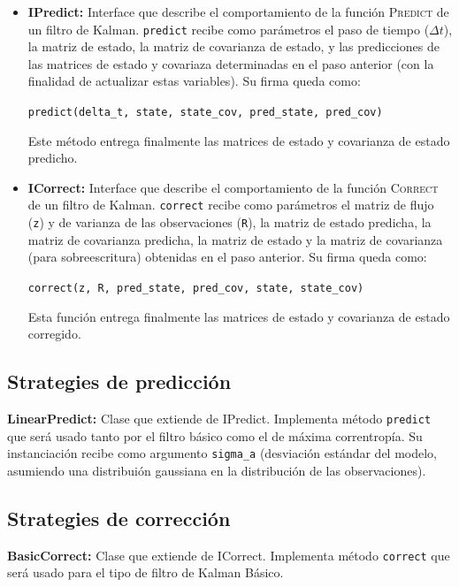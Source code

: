 \begin{itemize}
\item \textbf{IPredict:} Interface que describe el comportamiento de la funci\'on \textsc{Predict} de un filtro de Kalman. \texttt{predict} recibe como par\'ametros el paso de tiempo ($\Delta t$), la matriz de estado, la matriz de covarianza de estado, y las predicciones de las matrices de estado y covariaza determinadas en el paso anterior (con la finalidad de actualizar estas variables). Su firma queda como:
\begin{center}
\texttt{predict(delta\_t, state, state\_cov, pred\_state, pred\_cov)}
\end{center}
Este m\'etodo entrega finalmente las matrices de estado y covarianza de estado predicho.
\bigskip

\item \textbf{ICorrect:} Interface que describe el comportamiento de la funci\'on \textsc{Correct} de un filtro de Kalman. \texttt{correct} recibe como par\'ametros el matriz de flujo (\texttt{z}) y de varianza de las observaciones (\texttt{R}), la matriz de estado predicha, la matriz de covarianza predicha, la matriz de estado y la matriz de covarianza (para sobreescritura) obtenidas en el paso anterior. Su firma queda como:
\begin{center}
\texttt{correct(z, R, pred\_state, pred\_cov, state, state\_cov)}
\end{center}
\bigskip
Esta funci\'on entrega finalmente las matrices de estado y covarianza de estado corregido.

\end{itemize}

\subsection{Strategies de predicci\'on}
\textbf{LinearPredict:} Clase que extiende de IPredict. Implementa m\'etodo \texttt{predict} que ser\'a usado tanto por el filtro b\'asico como el de m\'axima correntrop\'ia. Su instanciaci\'on recibe como argumento \texttt{sigma\_a} (desviaci\'on est\'andar del modelo, asumiendo una distribui\'on gaussiana en la distribuci\'on de las observaciones).
\bigskip


\subsection{Strategies de correcci\'on}
\textbf{BasicCorrect:} Clase que extiende de ICorrect. Implementa m\'etodo \texttt{correct} que ser\'a usado para el tipo de filtro de Kalman B\'asico.
\bigskip


